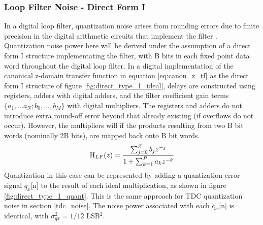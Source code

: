 \subsubsection{Loop Filter Noise - Direct Form I}\label{lf_noise}
	In a digital loop filter, quantization noise arises from rounding errors due to finite precision in the digital arithmetic circuits that implement the filter \cite{proakis_1993_fwe}. Quantization noise power here will be derived under the assumption of a direct form I structure implementating the filter, with B bits in each fixed point data word throughout the digital loop filter. In a digital implementation of the canonical z-domain transfer function in equation \ref{eq:canon_z_tf} as the direct form I structure of figure \ref{fig:direct_type_1_ideal}, delays are constructed using registers, adders with digital adders, and the filter coefficient gain terms $\{a_1, ... a_N; b_0, ..., b_M\}$ with digital multipliers. The registers and adders do not introduce extra round-off error beyond that already existing (if overflows do not occur). However, the multipliers will if the products resulting from two B bit words (nominally 2B bits), are mapped back onto B bit words.
	\begin{equation}
		\textnormal{H}_{LF}(z) = \frac{\sum_{j=0}^Z b_jz^{-j}}{1+\sum_{k=1}^P a_kz^{-k}}\label{eq:canon_z_tf}
	\end{equation}
	\FloatBarrier
	Quantization in this case can be represented by adding a quantization error signal $q_x$[n] to the result of each ideal multiplication, as shown in figure \ref{fig:direct_type_1_quant}. This is the same approach for TDC quantization noise in section \ref{tdc_noise}. The noise power associated with each q$_x$[n] is identical, with $\sigma_{qx}^2 = 1/12$ LSB$^2$. 

